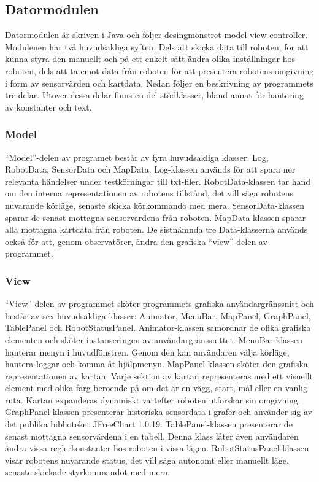 \documentclass[11pt]{article}
\begin{document}
\begin{flushleft}
\subsection{Datormodulen}
Datormodulen är skriven i Java och följer desingmönstret model-view-controller. Modulenen har två huvudsakliga syften. Dels att skicka data till roboten, för att kunna styra den manuellt och på ett enkelt sätt ändra olika inställningar hos roboten, dels att ta emot data från roboten för att presentera robotens omgivning i form av sensorvärden och kartdata. Nedan följer en beskrivning av programmets tre delar. Utöver dessa delar finns en del stödklasser, bland annat för hantering av konstanter och text.%

\subsubsection{Model}
``Model''-delen av programet består av fyra huvudsakliga klasser: Log, RobotData, SensorData och MapData. 
Log-klassen används för att spara ner relevanta händelser under testkörningar till txt-filer. 
RobotData-klassen tar hand om den interna representationen av robotens tillstånd, det vill säga robotens nuvarande körläge, senaste skicka körkommando med mera. 
SensorData-klassen sparar de senast mottagna sensorvärdena från roboten. 
MapData-klassen sparar alla mottagna kartdata från roboten. De sistnämnda tre Data-klasserna används också för att, genom observatörer, ändra den grafiska ``view''-delen av programmet.

\subsubsection{View}
``View''-delen av programmet sköter programmets grafiska användargränssnitt och består av sex huvudsakliga klasser: Animator, MenuBar, MapPanel, GraphPanel, TablePanel och RobotStatusPanel. Animator-klassen samordnar de olika grafiska elementen och sköter instanseringen av användargränssnittet. 
MenuBar-klassen hanterar menyn i huvudfönstren. Genom den kan användaren välja körläge, hantera loggar och komma åt hjälpmenyn. 
MapPanel-klassen sköter den grafiska representationen av kartan. Varje sektion av kartan representeras med ett visuellt element med olika färg beroende på om det är en vägg, start, mål eller en vanlig ruta. Kartan expanderas dynamiskt vartefter roboten utforskar sin omgivning. 
GraphPanel-klassen presenterar historiska sensordata i grafer och använder sig av det publika biblioteket JFreeChart 1.0.19. 
TablePanel-klassen presenterar de senast mottagna sensorvärdena i en tabell. Denna klass låter även användaren ändra vissa reglerkonstanter hos roboten i vissa lägen.
RobotStatusPanel-klassen visar robotens nuvarande status, det vill säga autonomt eller manuellt läge, senaste skickade styrkommandot med mera.


\end{flushleft}
\end{document}
